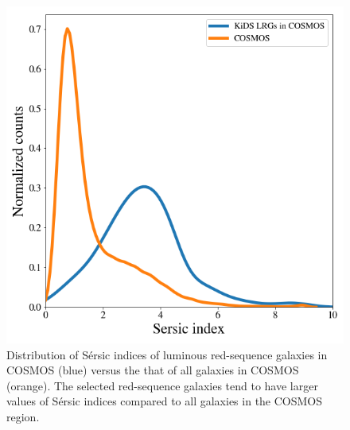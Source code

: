 \documentclass{aa}
\numberwithin{equation}{section}
\begin{document}
{\begin{figure}
\includegraphics[width=\columnwidth]{figures_tmp/cosmos_sersic.png}
\caption{Distribution of S\'{e}rsic indices of luminous red-sequence galaxies in COSMOS (blue) versus the that of all galaxies in COSMOS (orange). The selected red-sequence galaxies tend to have larger values of S\'{e}rsic indices compared to all galaxies in the COSMOS region.}
\label{fig:cosmos_sersic}
\end{figure}

}
\end{document}
